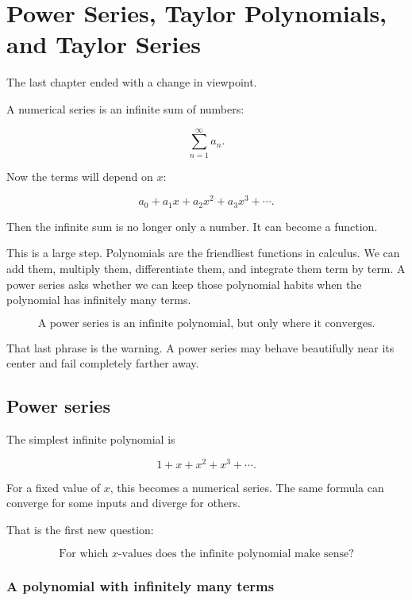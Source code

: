 
\chapter{Power Series, Taylor Polynomials, and Taylor Series}
\label{chap:power-series-taylor}

The last chapter ended with a change in viewpoint.

A numerical series is an infinite sum of numbers:

\[
\sum_{n=1}^{\infty} a_n.
\]

Now the terms will depend on \(x\):

\[
a_0+a_1x+a_2x^2+a_3x^3+\cdots.
\]

Then the infinite sum is no longer only a number.  It can become a function.

This is a large step.  Polynomials are the friendliest functions in calculus.  We can add
them, multiply them, differentiate them, and integrate them term by term.  A power
series asks whether we can keep those polynomial habits when the polynomial has
infinitely many terms.

\[
\boxed{
\text{A power series is an infinite polynomial, but only where it converges.}
}
\]

That last phrase is the warning.  A power series may behave beautifully near its center
and fail completely farther away.

\section{Power series}
\label{sec:power-series}

The simplest infinite polynomial is

\[
1+x+x^2+x^3+\cdots.
\]

For a fixed value of \(x\), this becomes a numerical series.  The same formula can
converge for some inputs and diverge for others.

That is the first new question:

\[
\boxed{
\text{For which \(x\)-values does the infinite polynomial make sense?}
}
\]

\subsection{A polynomial with infinitely many terms}
\label{subsec:polynomial-with-infinitely-many-terms}

